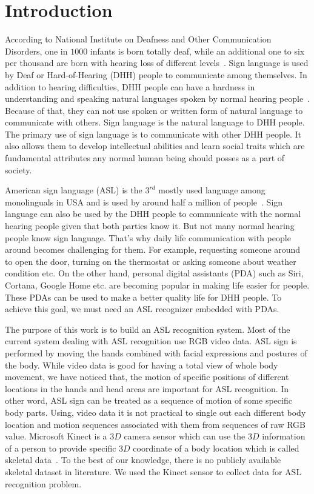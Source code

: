 \documentclass[10pt,twocolumn,letterpaper]{article}
\begin{document}
\section{Introduction}

According to National Institute on Deafness and Other Communication Disorders, one in $1000$ infants is born totally deaf, while an additional one to six per thousand are born with hearing loss of different levels~\cite{3072291}. Sign language is used by Deaf or Hard-of-Hearing (DHH) people to communicate among themselves. In addition to hearing difficulties, DHH people can have a hardness in understanding and speaking natural languages spoken by normal hearing people~\cite{doi:10.1080/01690965.2012.705006}. Because of that, they can not use spoken or written form of natural language to communicate with others. Sign language is the natural language to DHH people. The primary use of sign language is to communicate with other DHH people. It also allows them to develop intellectual abilities and learn social traits which are fundamental attributes any normal human being should posses as a part of society.

American sign language (ASL) is the $3^{rd}$ mostly used language among monolinguals in USA and is used by around half a million of people~\cite{sign_lang_study}. Sign language can also be used by the DHH people to communicate with the normal hearing people given that both parties know it. But not many normal hearing people know sign language. That's why daily life communication with people around becomes challenging for them. For example, requesting someone around to open the door, turning on the thermostat or asking someone about weather condition etc. On the other hand, personal digital assistants (PDA) such as Siri, Cortana, Google Home etc. are becoming popular in making life easier for people. These PDAs can be used to make a better quality life for DHH people. To achieve this goal, we must need an ASL recognizer embedded with PDAs.

The purpose of this work is to build an ASL recognition system. Most of the current  system dealing with ASL recognition use RGB video data. ASL sign is performed by moving the hands combined with facial expressions and postures of the body. While video data is good for having a total view of whole body movement, we have noticed that, the motion of specific positions of different locations in the hands and head areas are important for ASL recognition. In other word, ASL sign can be treated as a sequence of motion of some specific body parts. Using, video data it is not practical to single out each different body location and motion sequences associated with them from sequences of raw RGB value. Microsoft Kinect is a $3D$ camera sensor which can use the $3D$ information of a person to provide specific $3D$ coordinate of a body location which is called skeletal data~\cite{Zhang:2012:MKS:2225053.2225203}. To the best of our knowledge, there is no publicly available skeletal dataset in literature. We used the Kinect sensor to collect data for ASL recognition problem. 
\end{document}
